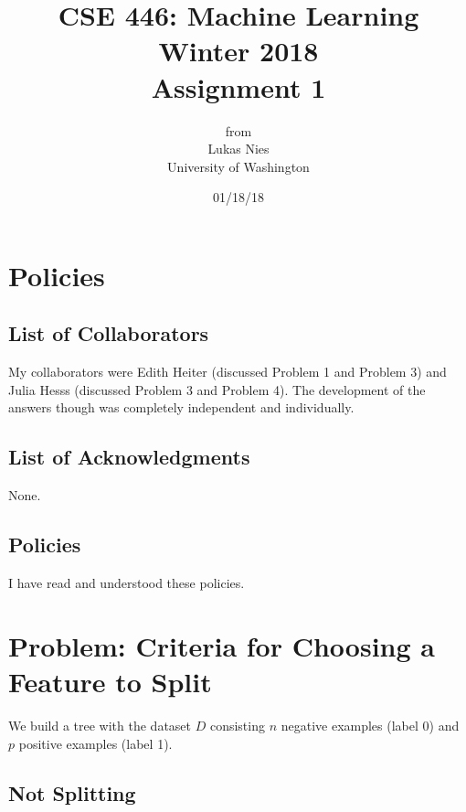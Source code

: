 \documentclass[12pt]{article}
\begin{document}
	
	\title{
		\textbf{\huge{CSE 446: Machine Learning Winter 2018 }} \\[2cm]
		\LARGE{Assignment 1}\\[1cm]
	}
	\author{from \\ Lukas Nies \\ University of Washington}
	\date{01/18/18}
	\clearpage\maketitle\thispagestyle{empty}
	\newpage

	\tableofcontents
	\setcounter{page}{0}
	\newpage
	
	\setcounter{section}{-1}
	

\section{Policies}

\subsection{List of Collaborators}

My collaborators were Edith Heiter (discussed Problem 1 and Problem 3) and Julia Hesss (discussed Problem 3 and Problem 4). The development of the answers though was completely independent and individually.

\subsection{List of Acknowledgments}

None.

\subsection{Policies}

I have read and understood these policies.

\section{Problem: Criteria for Choosing a Feature to Split}

We build a tree with the dataset $D$ consisting $n$ negative examples (label 0) and $p$ positive examples (label 1). 

\subsection{Not Splitting}
\end{document}
